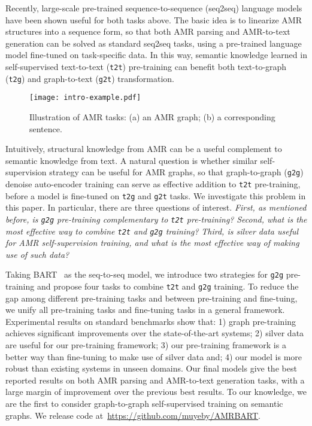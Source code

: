 \documentclass[11pt]{article}
\begin{document}
Recently, large-scale pre-trained sequence-to-sequence (seq2seq) language models \cite{lewis-etal-2020-bart,JMLR:v21:20-074} have been shown useful for both tasks above. 
The basic idea is to linearize AMR structures into a sequence form, so that both AMR parsing and AMR-to-text generation can be solved as standard seq2seq tasks, using a pre-trained language model fine-tuned on task-specific data. 
In this way, semantic knowledge learned in self-supervised text-to-text (\texttt{t2t}) pre-training can benefit both text-to-graph (\texttt{t2g}) and graph-to-text (\texttt{g2t}) transformation.

\begin{figure}
    \centering
    \texttt{[image: intro-example.pdf]}
    \caption{Illustration of AMR tasks: (a) an AMR graph; (b) a corresponding sentence.}
    \label{fig:intro-example}
\end{figure}

Intuitively, structural knowledge from AMR can be a useful complement to semantic knowledge from text. A natural question is whether similar self-supervision strategy can be useful for AMR graphs, so that graph-to-graph (\texttt{g2g}) denoise auto-encoder training can serve as effective addition to \texttt{t2t} pre-training, before a model is fine-tuned on \texttt{t2g} and \texttt{g2t} tasks. We investigate this problem in this paper.
In particular, there are three questions of interest. 
\textit{First, as mentioned before, is \texttt{g2g} pre-training complementary to \texttt{t2t} pre-training?}
\textit{Second, what is the most effective way to combine \texttt{t2t} and \texttt{g2g} training?} 
\textit{Third, is silver data useful for AMR self-supervision training, and what is the most effective way of making use of such data?} 


Taking BART~\cite{lewis-etal-2020-bart} as the seq-to-seq model, we introduce two strategies for \texttt{g2g} pre-training and propose four tasks to combine \texttt{t2t} and \texttt{g2g} training.
To reduce the gap among different pre-training tasks and between pre-training and fine-tuing, we unify all pre-training tasks and fine-tuning tasks in a general framework.
Experimental results on standard benchmarks show that: 1) graph pre-training achieves significant improvements over the state-of-the-art systems; 
2) silver data are useful for our pre-training framework;
3) our pre-training framework is a better way than fine-tuning to make use of silver data and;
4) our model is more robust than existing systems in unseen domains.
Our final models give the best reported results on both AMR parsing and AMR-to-text generation tasks, with a large margin of improvement over the previous best results.
To our knowledge, we are the first to consider graph-to-graph self-supervised training on semantic graphs.
We release code at~\url{https://github.com/muyeby/AMRBART}.
\end{document}
